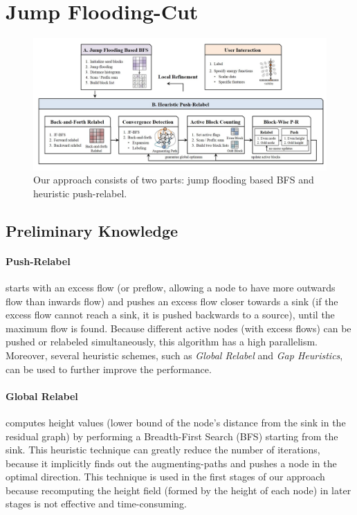 
\section{Jump Flooding-Cut}
\label{section jfcut}

\begin{figure}
\centering
\includegraphics[width=17cm]{figures/fig1.jpg}
\caption{Our approach consists of two parts: jump flooding based BFS and heuristic push-relabel.
}
\label{figure overview}
\end{figure}

\subsection{Preliminary Knowledge}

\paragraph*{\textbf{Push-Relabel}}
starts with an excess flow (or preflow, allowing a node to have more outwards flow than inwards flow) and pushes an excess flow closer towards a sink (if the excess flow cannot reach a sink, it is pushed backwards to a source), until the maximum flow is found.
Because different active nodes (with excess flows) can be pushed or relabeled simultaneously, this algorithm has a high parallelism.
Moreover, several heuristic schemes, such as \textit{Global Relabel} and \textit{Gap Heuristics}, can be used to further improve the performance.

\paragraph*{\textbf{Global Relabel}}

computes height values (lower bound of the node's distance from the sink in the residual graph) by performing a Breadth-First Search (BFS) starting from the sink.
This heuristic technique can greatly reduce the number of iterations, because it implicitly finds out the augmenting-paths and pushes a node in the optimal direction.
This technique is used in the first stages of our approach because recomputing the height field (formed by the height of each node) in later stages is not effective and time-consuming.

